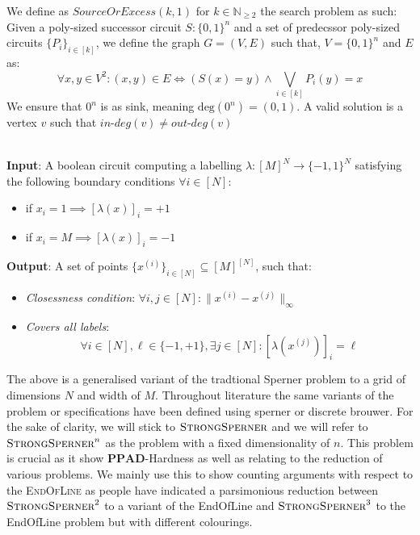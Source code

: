 \begin{definition}
    We define as $\textit{SourceOrExcess}(k,1)$ for $k \in \mathbb{N}_{\geq 2}$
    the search problem as such: Given a poly-sized successor circuit $S : \{0,1\}^n$
    and a set of predecssor poly-sized circuits $\{P_i\}_{i \in [k]}$, we define
    the graph $G = (V,E)$ such that, $V = \{0,1\}^n$ and $E$ as:
    $$
    \forall x, y \in V^2: (x,y) \in E \iff (S(x) = y) \wedge \bigvee_{i \in [k]} P_i(y) = x
    $$
    We ensure that $0^n$ is as sink, meaning $\text{deg}(0^n) = (0,1)$.
    A valid solution is a vertex $v$ such that $\textit{in-deg}(v) \neq \textit{out-deg}(v)$
\end{definition}




\begin{definition}\\
    \textbf{Input}: A boolean circuit computing a labelling $\lambda: [M]^N \to \{-1, 1\}^N$
    satisfying the following boundary conditions $\forall i \in [N]$:
    \begin{itemize}
        \item if $x_i = 1 \implies [\lambda(x)]_i = +1$
        \item if $x_i = M \implies [\lambda(x)]_i = -1$
    \end{itemize}
    \textbf{Output}: A set of points $\{x^{(i)}\}_{i \in [N]} \subseteq [M]^{[N]}$, such that:
    \begin{itemize}
        \item \textit{Closessness condition}: $\forall i,j \in [N]: \|x^{(i)} - x^{(j)}\|_{\infty}$
        \item \textit{Covers all labels}:
            $$
            \forall i \in [N], \ell \in \{-1, +1\}, \exists j \in [N]: [\lambda(x^{(j)})]_{i} = \ell
            $$
    \end{itemize}
\end{definition}


The above is a generalised variant of the tradtional Sperner problem to
a grid of dimensions $N$ and width of $M$. 
Throughout literature the same variants of the problem or specifications
have been defined using sperner or discrete brouwer. For the sake 
of clarity, we will stick to $\textsc{StrongSperner}$ and
we will refer to $\textsc{StrongSperner}^n$ as the problem
with a fixed dimensionality of $n$. This problem
is crucial as it show $\textbf{PPAD}$-Hardness as well as
relating to the reduction of various problems.
We mainly use this to show counting arguments with respect to the
\textsc{EndOfLine} as people have indicated a parsimonious reduction
between $\textsc{StrongSperner}^2$ to a variant of the EndOfLine
and $\textsc{StrongSperner}^3$ to the EndOfLine problem but with
different colourings.

